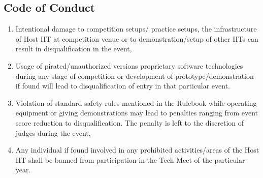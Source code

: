 \subsection{Code of Conduct}
\begin{enumerate}
    \item Intentional damage to competition setups/ practice setups, the infrastructure of Host IIT at competition venue or to demonstration/setup of other IITs can result in disqualification in the event,
    \item Usage of pirated/unauthorized versions proprietary software technologies during any stage of competition or development of prototype/demonstration if found will lead to disqualification of entry in that particular event.
    \item Violation of standard safety rules mentioned in the Rulebook while operating equipment or giving demonstrations may lead to penalties ranging from event score reduction to disqualification. The penalty is left to the discretion of judges during the event,
    \item Any individual if found involved in any prohibited activities/areas of the Host IIT shall be banned from participation in the Tech Meet of the particular year. 
\end{enumerate}

